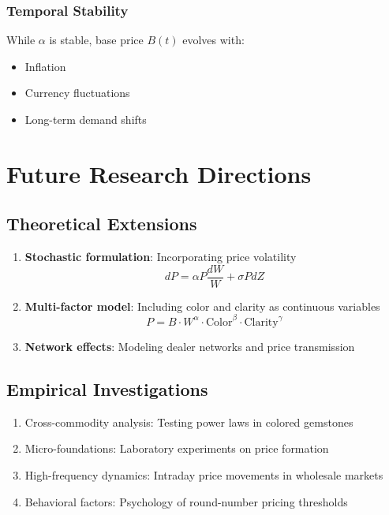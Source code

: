 \documentclass[12pt,a4paper]{article}
\theoremstyle{definition}
\theoremstyle{remark}
\begin{document}
\subsubsection{Temporal Stability}
While $\alpha$ is stable, base price $B(t)$ evolves with:
\begin{itemize}
\item Inflation
\item Currency fluctuations
\item Long-term demand shifts
\end{itemize}

\section{Future Research Directions}

\subsection{Theoretical Extensions}

\begin{enumerate}
\item \textbf{Stochastic formulation}: Incorporating price volatility
\begin{equation}
dP = \alpha P \frac{dW}{W} + \sigma P dZ
\end{equation}

\item \textbf{Multi-factor model}: Including color and clarity as continuous variables
\begin{equation}
P = B \cdot W^{\alpha} \cdot \text{Color}^{\beta} \cdot \text{Clarity}^{\gamma}
\end{equation}

\item \textbf{Network effects}: Modeling dealer networks and price transmission
\end{enumerate}

\subsection{Empirical Investigations}

\begin{enumerate}
\item Cross-commodity analysis: Testing power laws in colored gemstones
\item Micro-foundations: Laboratory experiments on price formation
\item High-frequency dynamics: Intraday price movements in wholesale markets
\item Behavioral factors: Psychology of round-number pricing thresholds
\end{enumerate}
\end{document}
